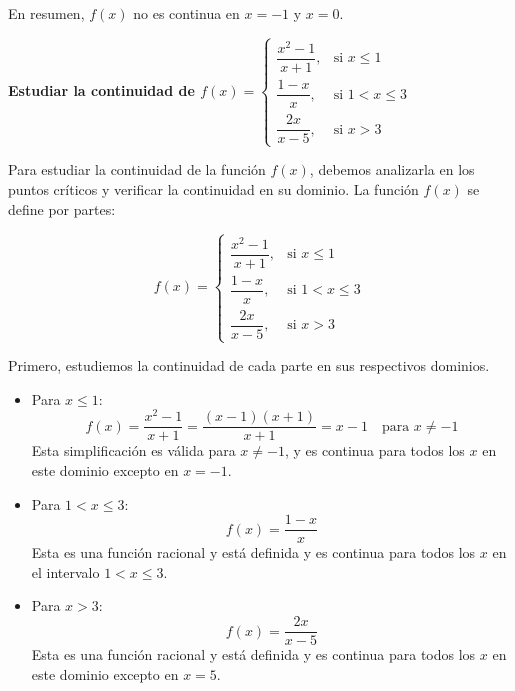 \documentclass[answers]{exam} %
\begin{document}
\begin{questions}
\begin{solution}
        En resumen, \( f(x) \) no es continua en \( x = -1 \) y \( x = 0 \).
    \end{solution}

    \vspace{0.5cm}
    \question \large\textbf{Estudiar la continuidad de \(f(x) =
    \begin{cases}
        \dfrac{x^2-1}{x+1}, & \text{si } x \le 1 \\[1em]
        \dfrac{1-x}{x}, & \text{si } 1 < x \le 3 \\[1em]
        \dfrac{2x}{x-5}, & \text{si } x > 3 
    \end{cases}\) }
    \begin{solution}
        Para estudiar la continuidad de la función \( f(x) \), debemos analizarla en los puntos críticos y verificar la continuidad en su dominio. La función \( f(x) \) se define por partes:
        
        \[
        f(x) =
        \begin{cases}
            \dfrac{x^2-1}{x+1}, & \text{si } x \le 1 \\[1em]
            \dfrac{1-x}{x}, & \text{si } 1 < x \le 3 \\[1em]
            \dfrac{2x}{x-5}, & \text{si } x > 3 
        \end{cases}
        \]
    
        Primero, estudiemos la continuidad de cada parte en sus respectivos dominios.
        
        \begin{itemize}
            \item Para \( x \le 1 \):
                \[
                f(x) = \frac{x^2 - 1}{x + 1} = \frac{(x - 1)(x + 1)}{x + 1} = x - 1 \quad \text{para } x \neq -1
                \]
                Esta simplificación es válida para \( x \neq -1 \), y es continua para todos los \( x \) en este dominio excepto en \( x = -1 \).
                
            \item Para \( 1 < x \le 3 \):
                \[
                f(x) = \frac{1 - x}{x}
                \]
                Esta es una función racional y está definida y es continua para todos los \( x \) en el intervalo \( 1 < x \le 3 \).
                
            \item Para \( x > 3 \):
                \[
                f(x) = \frac{2x}{x - 5}
                \]
                Esta es una función racional y está definida y es continua para todos los \( x \) en este dominio excepto en \( x = 5 \).
        \end{itemize}
        

\end{solution}
\end{questions}
\end{document}

